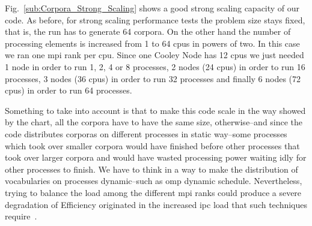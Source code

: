 \documentclass[10pt,journal,compsoc]{IEEEtran}
\begin{document}

Fig.~\ref{sub:Corpora_Strong_Scaling} shows a good strong scaling capacity of our code. As before, for strong scaling performance tests the problem size stays fixed, that is, the run has to generate 64 corpora. On the other hand the number of processing elements is increased from 1 to 64 \glspl{cpu} in powers of two. In this case we ran one \gls{mpi} rank per \gls{cpu}. Since one Cooley Node has 12 \glspl{cpu} we just needed 1 node in order to run 1, 2, 4 or 8 processes, 2 nodes (24 \glspl{cpu}) in order to run 16 processes, 3 nodes (36 \glspl{cpu}) in order to run 32 processes and finally 6 nodes (72 \glspl{cpu}) in order to run 64 processes.


Something to take into account is that to make this code scale in the way showed by the chart, all the corpora have to have the same size, otherwise--and since the code distributes corporas on different processes in static way--some processes which took over smaller corpora would have finished before other processes that took over larger corpora and would have wasted processing power waiting idly for other processes to finish. We have to think in a way to make the distribution of vocabularies on processes dynamic--such as \gls{omp} dynamic schedule. Nevertheless, trying to balance the load among the different \gls{mpi} ranks could produce a severe degradation of Efficiency originated in the increased \gls{ipc} load that such techniques require~\cite{hu2012biophysically}.
\end{document}
